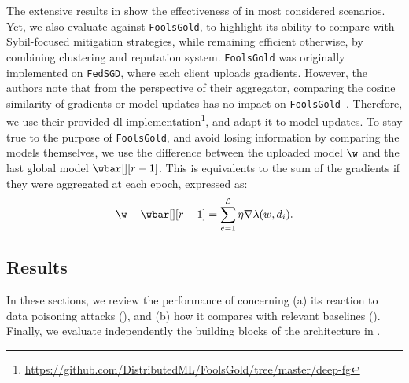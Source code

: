The extensive results in  show the effectiveness of \thecontrib in most considered scenarios.
Yet, we also evaluate \thecontrib against \texttt{FoolsGold}, to highlight its ability to compare with Sybil-focused mitigation strategies, while remaining efficient otherwise, by combining clustering and reputation system.
\texttt{FoolsGold} was originally implemented on \texttt{FedSGD}, where each client uploads gradients. %
However, the authors note that from the perspective of their aggregator, comparing the cosine similarity of gradients or model updates has no impact on \texttt{FoolsGold}~\cite{fung_limitations_2020}.
Therefore, we use their provided \gls{dl} implementation\footnote{\url{https://github.com/DistributedML/FoolsGold/tree/master/deep-fg}}, and adapt it to model updates.
To stay true to the purpose of \texttt{FoolsGold}, and avoid losing information by comparing the models themselves, we use the difference between the uploaded model $\w$ and the last global model $\wbar[][r-1]$.
This is equivalents to the sum of the gradients if they were aggregated at each epoch, expressed as:
\begin{equation}\label{eq:gradients}
    \w - \wbar[][r-1] = \sum_{e=1}^\mathcal{E} \eta \nabla \lambda(w,d_i).
\end{equation}

\subsection{Results\label{sec:eval.results}}

In these sections, we review the performance of \thecontrib concerning (a) its reaction to data poisoning attacks (), and (b) how it compares with relevant baselines ().
Finally, we evaluate independently the building blocks of the architecture in .

